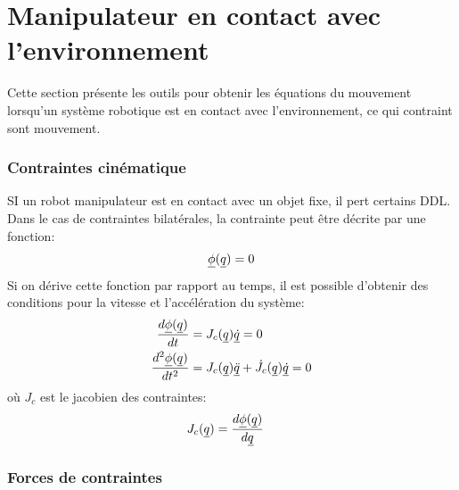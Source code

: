 \newpage
\section{Manipulateur en contact avec l'environnement}
\label{sec:contact}

Cette section présente les outils pour obtenir les équations du mouvement lorsqu'un système robotique est en contact avec l'environnement, ce qui contraint sont mouvement. 

\subsubsection{Contraintes cinématique}
\label{sec:constraints}
%
SI un robot manipulateur est en contact avec un objet fixe, il pert certains DDL. Dans le cas de contraintes bilatérales, la contrainte peut être décrite par une fonction:
\begin{align}
\underline{\phi}( \underline{ q } ) = 0
\label{eq:constraint}
\end{align}
%
Si on dérive cette fonction par rapport au temps, il est possible d'obtenir des conditions pour la vitesse et l'accélération du système:
\begin{align}
\frac{d \underline{\phi}( \underline{ q } ) }{dt}     &= J_c( \underline{ q } ) \underline{\dot{q}}  = 0 \\
\frac{d^2 \underline{\phi}( \underline{ q } ) }{dt^2} &= J_c( \underline{ q } ) \underline{\ddot{q}}  + \dot{J}_c( \underline{ q } ) \underline{\dot{q}} = 0 
\label{eq:constraint_diff}
\end{align}
%
où $J_c$ est le jacobien des contraintes:
%
\begin{align}
J_c( \underline{ q } )                    &= \frac{d \underline{\phi}( \underline{ q } ) }{d\underline{ q }}
\label{eq:constraint_jaco}
\end{align}

\subsubsection{Forces de contraintes}
\label{sec:constraint_forces}

